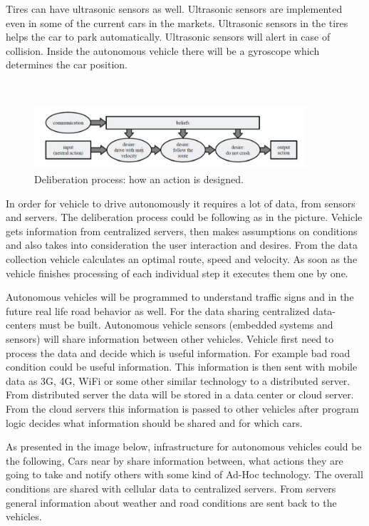 \documentclass[english]{tktltiki}
\begin{document}
Tires can have ultrasonic sensors as well. Ultrasonic sensors are implemented even in some of the current cars in the markets. Ultrasonic sensors in the tires helps the car to park automatically. Ultrasonic sensors will alert in case of collision. Inside the autonomous vehicle there will be a gyroscope which determines the car position. 

\begin{figure}[h]
\ \newline
\begin{center}
\includegraphics[width=0.9\textwidth]{process.png}
\caption{Deliberation process: how an action is designed. 
\cite{trafficmodels}}
\label{vehicle automation flow}
\end{center}
\end{figure}

In order for vehicle to drive autonomously it requires a lot of data, from sensors and servers. The deliberation process could be following as in the picture. Vehicle gets information from centralized servers, then makes assumptions on conditions and also takes into consideration the user interaction and desires. From the data collection vehicle calculates an optimal route, speed and velocity. As soon as the vehicle finishes processing of each individual step it executes them one by one.  

Autonomous vehicles will be programmed to understand traffic signs and in the future real life road behavior as well. For the data sharing centralized data-centers must be built. Autonomous vehicle sensors (embedded systems and sensors) will share information between other vehicles. Vehicle first need to process the data and decide which is useful information. For example bad road condition could be useful information. This information is then sent with mobile data as 3G, 4G, WiFi or some other similar technology to a distributed server. From distributed server the data will be stored in a data center or cloud server. From the cloud servers this information is passed to other vehicles after program logic decides what information should be shared and for which cars.  

As presented in the image below, infrastructure for autonomous vehicles could be the following, \cite{trafficmodels} Cars near by share information between, what actions they are going to take and notify others with some kind of Ad-Hoc technology. The overall conditions are shared with cellular data to centralized servers. From servers general information about weather and road conditions are sent back to the vehicles. 
\end{document}
